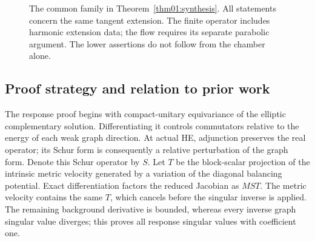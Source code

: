 \documentclass[11pt]{amsart}
\theoremstyle{definition}
\theoremstyle{remark}
\begin{document}
\begin{figure}[htbp]
\centering
{}
\caption{The common family in Theorem~\ref{thm01:synthesis}.
All statements concern the same tangent extension. The finite
operator includes harmonic extension data; the flow requires
its separate parabolic argument. The lower assertions do not
follow from the chamber alone.}
\label{fig01:synthesis}
\end{figure}


\subsection*{Proof strategy and relation to prior work}
The response proof begins with compact-unitary equivariance of the
elliptic complementary solution. Differentiating it controls
commutators relative to the energy of each weak graph direction.
At actual HE, adjunction preserves the real operator; its Schur
form is consequently a relative perturbation of the graph form.
Denote this Schur operator by \(S\). Let \(T\) be the block-scalar
projection of the intrinsic metric velocity generated by a
variation of the diagonal balancing potential.
Exact differentiation factors the reduced Jacobian as \(MST\).
The metric velocity contains the same \(T\), which cancels before
the singular inverse is applied. The remaining background derivative
is bounded, whereas every inverse graph singular value diverges;
this proves all response singular values with coefficient one.
\end{document}
